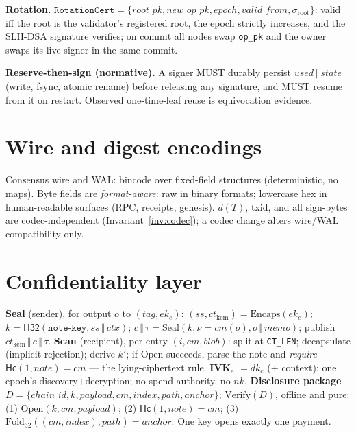 \documentclass[10pt]{article}
\newcommand{\ct}[1]{\texttt{#1}}
\newcommand{\Hs}{\mathsf{H32}}
\newcommand{\Hc}{\mathsf{Hc}}
\newcommand{\cat}{\,\Vert\,}
\begin{document}
\textbf{Rotation.} $\ct{RotationCert} = \{\mathit{root\_pk}, \mathit{new\_op\_pk}, \mathit{epoch}, \mathit{valid\_from}, \sigma_{\mathrm{root}}\}$: valid iff the root is the validator's registered root, the epoch strictly increases, and the SLH-DSA signature verifies; on commit all nodes swap \ct{op\_pk} and the owner swaps its live signer in the same commit.

\textbf{Reserve-then-sign (normative).} A signer MUST durably persist $\mathit{used}\cat\mathit{state}$ (write, fsync, atomic rename) before releasing any signature, and MUST resume from it on restart. Observed one-time-leaf reuse is equivocation evidence.

\section{Wire and digest encodings}
Consensus wire and WAL: bincode over fixed-field structures (deterministic, no maps). Byte fields are \emph{format-aware}: raw in binary formats; lowercase hex in human-readable surfaces (RPC, receipts, genesis). $d(T)$, txid, and all sign-bytes are codec-independent (Invariant~\ref{inv:codec}); a codec change alters wire/WAL compatibility only.

\section{Confidentiality layer}
\textbf{Seal} (sender), for output $o$ to $(\mathit{tag}, \mathit{ek}_e)$: $(\mathit{ss}, \mathit{ct}_{\mathrm{kem}}) = \mathrm{Encaps}(\mathit{ek}_e)$; $k = \Hs(\ct{note-key}, \mathit{ss}\cat\mathit{ctx})$; $c\cat\tau = \mathrm{Seal}(k, \nu{=}\mathit{cm}(o), o\cat\mathit{memo})$; publish $\mathit{ct}_{\mathrm{kem}} \cat c \cat \tau$. \textbf{Scan} (recipient), per entry $(i, \mathit{cm}, \mathit{blob})$: split at \ct{CT\_LEN}; decapsulate (implicit rejection); derive $k'$; if $\mathrm{Open}$ succeeds, parse the note and \emph{require} $\Hc(1, \mathit{note}) = \mathit{cm}$ --- the lying-ciphertext rule. \textbf{IVK}$_e$ $= \mathit{dk}_e$ ($+$ context): one epoch's discovery$+$decryption; no spend authority, no $\mathit{nk}$. \textbf{Disclosure package} $D = \{\mathit{chain\_id}, k, \mathit{payload}, \mathit{cm}, \mathit{index}, \mathit{path}, \mathit{anchor}\}$; $\mathrm{Verify}(D)$, offline and pure: (1) $\mathrm{Open}(k, \mathit{cm}, \mathit{payload})$; (2) $\Hc(1, \mathit{note}) = \mathit{cm}$; (3) $\mathrm{Fold}_{32}((\mathit{cm}, \mathit{index}), \mathit{path}) = \mathit{anchor}$. One key opens exactly one payment.
\end{document}
